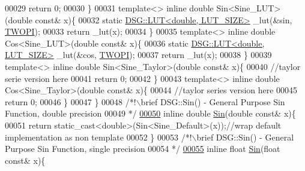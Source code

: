 \begin{DoxyCode}
00029             \textcolor{keywordflow}{return} 0;
00030         \}
00031         \textcolor{keyword}{template}<> \textcolor{keyword}{inline} \textcolor{keywordtype}{double} Sin<Sine\_LUT>(\textcolor{keywordtype}{double} \textcolor{keyword}{const}& x)\{
00032             \textcolor{keyword}{static} \hyperlink{class_d_s_g_1_1_l_u_t}{DSG::LUT<double, LUT\_SIZE>} \_lut(&sin,
      \hyperlink{_p_i_8h_a4912c64aec0c943b7985db6cb61ff83a}{TWOPI});
00033             \textcolor{keywordflow}{return} \_lut(x);
00034         \}
00035         \textcolor{keyword}{template}<> \textcolor{keyword}{inline} \textcolor{keywordtype}{double} Cos<Sine\_LUT>(\textcolor{keywordtype}{double} \textcolor{keyword}{const}& x)\{
00036             \textcolor{keyword}{static} \hyperlink{class_d_s_g_1_1_l_u_t}{DSG::LUT<double, LUT\_SIZE>} \_lut(&cos,
      \hyperlink{_p_i_8h_a4912c64aec0c943b7985db6cb61ff83a}{TWOPI});
00037             \textcolor{keywordflow}{return} \_lut(x);
00038         \}
00039         \textcolor{keyword}{template}<> \textcolor{keyword}{inline} \textcolor{keywordtype}{double} Sin<Sine\_Taylor>(\textcolor{keywordtype}{double} \textcolor{keyword}{const}& x)\{
00040             \textcolor{comment}{//taylor serie version here}
00041             \textcolor{keywordflow}{return} 0;
00042         \}
00043         \textcolor{keyword}{template}<> \textcolor{keyword}{inline} \textcolor{keywordtype}{double} Cos<Sine\_Taylor>(\textcolor{keywordtype}{double} \textcolor{keyword}{const}& x)\{
00044             \textcolor{comment}{//taylor series version here}
00045             \textcolor{keywordflow}{return} 0;
00046         \}
00047     \}\textcolor{comment}{}
00048 \textcolor{comment}{    /*!\(\backslash\)brief DSG::Sin() - General Purpose Sin Function, double precision}
00049 \textcolor{comment}{     */}
\hypertarget{_sine_8h_source_l00050}{}\hyperlink{namespace_d_s_g_aad63d316081c7d13a551acf346ee2749}{00050}     \textcolor{keyword}{inline} \textcolor{keywordtype}{double} \hyperlink{namespace_d_s_g_aad63d316081c7d13a551acf346ee2749}{Sin}(\textcolor{keywordtype}{double} \textcolor{keyword}{const}& x)\{
00051         \textcolor{keywordflow}{return} \textcolor{keyword}{static\_cast<}\textcolor{keywordtype}{double}\textcolor{keyword}{>}(Sin<Sine\_Default>(x));\textcolor{comment}{//wrap default implementation as non template}
00052     \}\textcolor{comment}{}
00053 \textcolor{comment}{    /*!\(\backslash\)brief DSG::Sin() - General Purpose Sin Function, single precision}
00054 \textcolor{comment}{     */}
\hypertarget{_sine_8h_source_l00055}{}\hyperlink{namespace_d_s_g_aa2f9baa8896fff266c5e7ee73fb5c3d5}{00055}     \textcolor{keyword}{inline} \textcolor{keywordtype}{float} \hyperlink{namespace_d_s_g_aad63d316081c7d13a551acf346ee2749}{Sin}(\textcolor{keywordtype}{float} \textcolor{keyword}{const}& x)\{

\end{DoxyCode}
